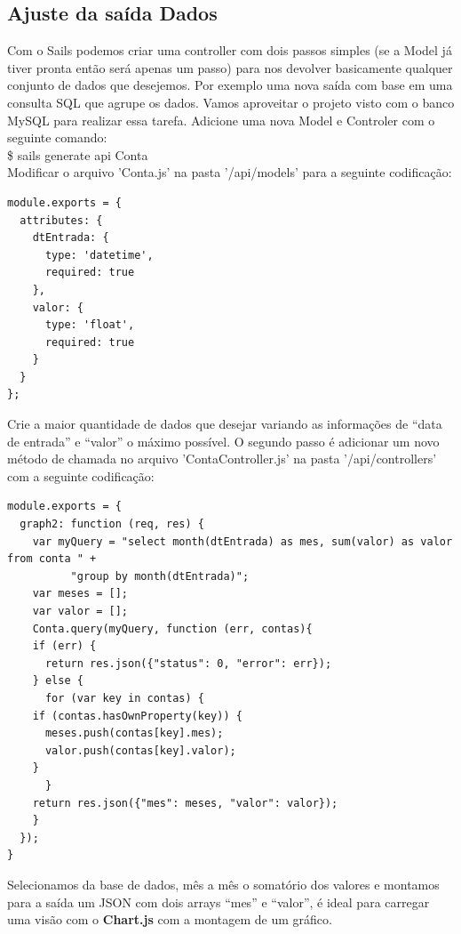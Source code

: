\documentclass[a4paper,11pt]{article}
\begin{document}
\subsection{Ajuste da saída Dados}
Com o Sails podemos criar uma controller com dois passos simples (se a Model já tiver pronta então será apenas um passo) para nos devolver basicamente qualquer conjunto de dados que desejemos. Por exemplo uma nova saída com base em uma consulta SQL que agrupe os dados. Vamos aproveitar o projeto visto com o banco MySQL para realizar essa tarefa. Adicione uma nova Model e Controler com o seguinte comando: \\[1mm]
{\ttfamily\$ sails generate api Conta} \\[3mm]
Modificar o arquivo 'Conta.js' na pasta '/api/models' para a seguinte codificação:
\begin{lstlisting}
module.exports = {
  attributes: {
    dtEntrada: {
      type: 'datetime',
      required: true
    },
    valor: {
      type: 'float',
      required: true
    }
  }
};
\end{lstlisting}
Crie a maior quantidade de dados que desejar variando as informações de ``data de entrada'' e ``valor'' o máximo possível. O segundo passo é adicionar um novo método de chamada no arquivo 'ContaController.js' na pasta '/api/controllers' com a seguinte codificação:
\begin{lstlisting}
module.exports = {
  graph2: function (req, res) {
    var myQuery = "select month(dtEntrada) as mes, sum(valor) as valor from conta " +
 		  "group by month(dtEntrada)";
    var meses = [];
    var valor = [];
    Conta.query(myQuery, function (err, contas){
    if (err) {
      return res.json({"status": 0, "error": err});
    } else {
      for (var key in contas) {
	if (contas.hasOwnProperty(key)) {
	  meses.push(contas[key].mes);
	  valor.push(contas[key].valor);
	}
      }
    return res.json({"mes": meses, "valor": valor});
    }
  });
}
\end{lstlisting}
Selecionamos da base de dados, mês a mês o somatório dos valores e montamos para a saída um JSON com dois arrays ``mes'' e ``valor'', é ideal para carregar uma visão com o \textbf{Chart.js} com a montagem de um gráfico.
\end{document}
